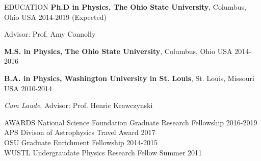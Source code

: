 \documentclass{resume} %
\newenvironment{list1}{
  \begin{list}{\ding{113}}{%
      \setlength{\itemsep}{0in}
      \setlength{\parsep}{0in} \setlength{\parskip}{0in}
      \setlength{\topsep}{0in} \setlength{\partopsep}{0in} 
      \setlength{\leftmargin}{0.17in}}}{\end{list}}
\begin{document}

\begin{rSection}{EDUCATION}
\textbf{Ph.D in Physics, The Ohio State University}, Columbus, Ohio USA \hfill 2014-2019 (Expected)\\
\vspace*{-.15in}
\begin{list1}
\item[]Advisor: Prof. Amy Connolly
\end{list1}

\textbf{M.S. in Physics, The Ohio State University}, Columbus, Ohio USA \hfill 2014-2016

\textbf{B.A. in Physics, Washington University in St. Louis}, St. Louis, Missouri USA \hfill 2010-2014\\
\vspace*{-.15in}
\begin{list1}
\item[] \textit{Cum Laude}, Advisor: Prof. Henric Krawczynski
\end{list1}
\end{rSection}


\begin{rSection}{AWARDS}
National Science Foundation Graduate Research Fellowship \hfill 2016-2019 \\
APS Divison of Astrophysics Travel Award \hfill 2017 \\
OSU Graduate Enrichment Fellowship \hfill 2014-2015 \\
WUSTL Undergraudate Physics Research Fellow \hfill Summer 2011 
\end{rSection}

\end{document}
